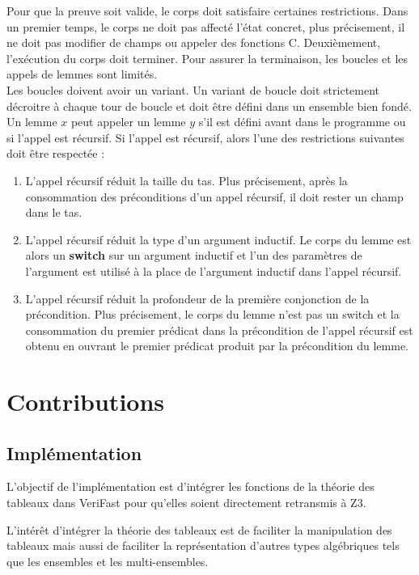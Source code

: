 \documentclass[11pt,openany]{article}
\newcommand{\verifast}{VeriFast}
\begin{document}
			Pour que la preuve soit valide, le corps doit satisfaire certaines restrictions. Dans un premier temps, le corps ne doit pas affect\'e l'\'etat concret, plus pr\'ecisement, il ne doit pas modifier de champs ou appeler des fonctions C. Deuxi\`emement, l'ex\'ecution du corps doit terminer. Pour assurer la terminaison, les boucles et les appels de lemmes sont limit\'es. \\
			Les boucles doivent avoir un variant. Un variant de boucle doit strictement d\'ecroitre  \`a chaque tour de boucle et doit \^etre d\'efini dans un ensemble bien fond\'e.\\
			Un lemme $x$ peut appeler un lemme $y$ s'il est d\'efini avant dans le programme ou si l'appel est r\'ecursif. Si l'appel est r\'ecursif, alors l'une des restrictions suivantes doit \^etre respect\'ee :
			\begin{enumerate}
			\item L'appel r\'ecursif r\'eduit la taille du tas. Plus pr\'ecisement, apr\`es la consommation des pr\'econditions d'un appel r\'ecursif, il doit rester un champ dans le tas.
			\item L'appel r\'ecursif r\'eduit la type d'un argument inductif. Le corps du lemme est alors un \textbf{switch} sur un argument inductif et l'un des param\`etres de l'argument est utilis\'e \`a la place de l'argument inductif dans l'appel r\'ecursif.
			\item L'appel r\'ecursif r\'eduit la profondeur de la premi\`ere conjonction de la pr\'econdition. Plus pr\'ecisement, le corps du lemme n'est pas un switch et la consommation du premier pr\'edicat dans la pr\'econdition de l'appel r\'ecursif est obtenu en ouvrant le premier pr\'edicat produit par la pr\'econdition du lemme.
			\end{enumerate}
				

\section{Contributions}
	\subsection{Impl\'ementation}
	L'objectif de l'impl\'ementation est d'int\'egrer les fonctions de la th\'eorie des tableaux dans \verifast{} pour qu'elles soient directement retransmis \`a Z3.
	
	L'int\'er\^et d'int\'egrer la th\'eorie des tableaux est de faciliter la manipulation des tableaux mais aussi de faciliter la repr\'esentation d'autres types alg\'ebriques tels que les ensembles et les multi-ensembles.
	
\end{document}
